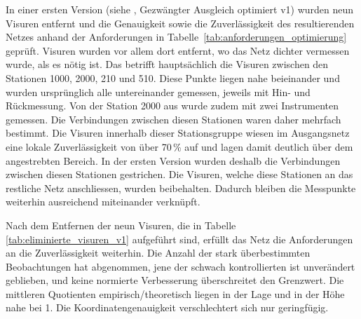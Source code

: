 In einer ersten Version (siehe , Gezwängter Ausgleich optimiert v1) wurden neun Visuren entfernt und die Genauigkeit sowie die Zuverlässigkeit des resultierenden Netzes 
anhand der Anforderungen in Tabelle~\ref{tab:anforderungen_optimierung} geprüft. Visuren wurden vor allem dort entfernt, wo das Netz dichter 
vermessen wurde, als es nötig ist. Das betrifft hauptsächlich die Visuren zwischen den Stationen 1000, 2000, 210 und 510. Diese 
Punkte liegen nahe beieinander und wurden ursprünglich alle untereinander gemessen, jeweils mit Hin- und Rückmessung. Von der 
Station 2000 aus wurde zudem mit zwei Instrumenten gemessen. Die Verbindungen zwischen diesen Stationen
waren daher mehrfach bestimmt. Die Visuren innerhalb dieser Stationsgruppe wiesen im Ausgangsnetz eine lokale
Zuverlässigkeit von über 70\,\% auf und lagen damit deutlich über dem angestrebten Bereich. In der ersten Version
wurden deshalb die Verbindungen zwischen diesen Stationen gestrichen. Die Visuren, welche diese Stationen an das
restliche Netz anschliessen, wurden beibehalten. Dadurch bleiben die Messpunkte weiterhin ausreichend miteinander
verknüpft.\bigskip

Nach dem Entfernen der neun Visuren, die in Tabelle \ref{tab:eliminierte_visuren_v1} aufgeführt sind, erfüllt das Netz die Anforderungen an die Zuverlässigkeit weiterhin. Die Anzahl
der stark überbestimmten Beobachtungen hat abgenommen, jene der schwach kontrollierten ist unverändert geblieben, und
keine normierte Verbesserung überschreitet den Grenzwert. Die mittleren Quotienten empirisch/theoretisch liegen in der
Lage und in der Höhe nahe bei 1. Die Koordinatengenauigkeit verschlechtert sich nur geringfügig.\bigskip

